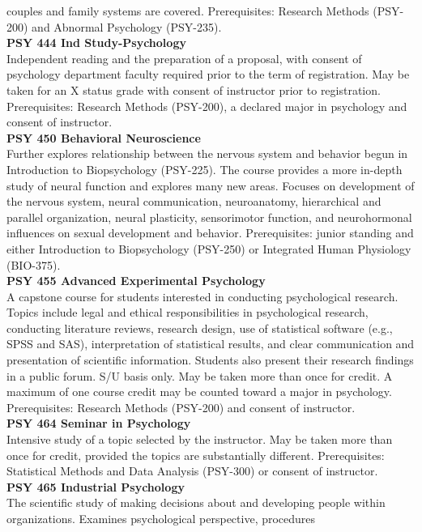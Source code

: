 \documentclass[
  letterpaper,
]{scrbook}
\begin{document}
couples and family systems are covered. Prerequisites: Research Methods
(PSY-200) and Abnormal Psychology (PSY-235).\\
\textbf{PSY 444 Ind Study-Psychology}\\
Independent reading and the preparation of a proposal, with consent of
psychology department faculty required prior to the term of
registration. May be taken for an X status grade with consent of
instructor prior to registration. Prerequisites: Research Methods
(PSY-200), a declared major in psychology and consent of instructor.\\
\textbf{PSY 450 Behavioral Neuroscience}\\
Further explores relationship between the nervous system and behavior
begun in Introduction to Biopsychology (PSY-225). The course provides a
more in-depth study of neural function and explores many new areas.
Focuses on development of the nervous system, neural communication,
neuroanatomy, hierarchical and parallel organization, neural plasticity,
sensorimotor function, and neurohormonal influences on sexual
development and behavior. Prerequisites: junior standing and either
Introduction to Biopsychology (PSY-250) or Integrated Human Physiology
(BIO-375).\\
\textbf{PSY 455 Advanced Experimental Psychology}\\
A capstone course for students interested in conducting psychological
research. Topics include legal and ethical responsibilities in
psychological research, conducting literature reviews, research design,
use of statistical software (e.g., SPSS and SAS), interpretation of
statistical results, and clear communication and presentation of
scientific information. Students also present their research findings in
a public forum. S/U basis only. May be taken more than once for credit.
A maximum of one course credit may be counted toward a major in
psychology. Prerequisites: Research Methods (PSY-200) and consent of
instructor.\\
\textbf{PSY 464 Seminar in Psychology}\\
Intensive study of a topic selected by the instructor. May be taken more
than once for credit, provided the topics are substantially different.
Prerequisites: Statistical Methods and Data Analysis (PSY-300) or
consent of instructor.\\
\textbf{PSY 465 Industrial Psychology}\\
The scientific study of making decisions about and developing people
within organizations. Examines psychological perspective, procedures
\end{document}

